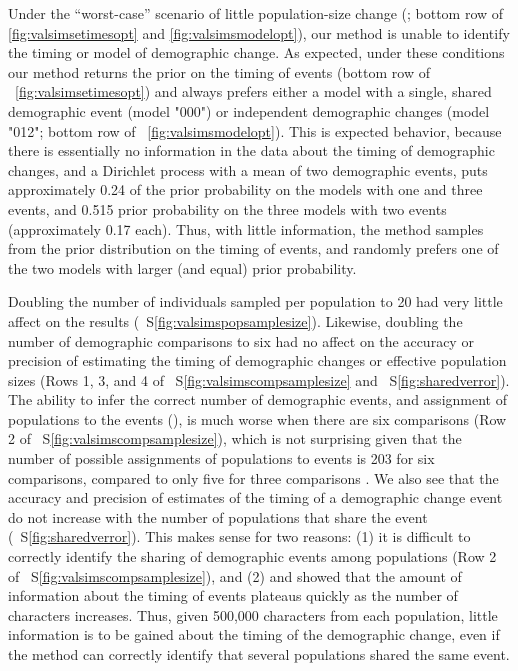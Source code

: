 \ifembed{

}{}

Under the ``worst-case'' scenario of little population-size change
(\vsimnochange; bottom row of \figs \ref{fig:valsimsetimesopt} and
\ref{fig:valsimsmodelopt}),
our method is unable to identify the timing or model of demographic change.
As expected, under these conditions our method returns the prior on the timing
of events (bottom row of \fig{}~\ref{fig:valsimsetimesopt})
and always prefers either a model with a single, shared demographic
event (model "000") or independent demographic changes (model "012";
bottom row of \fig{}~\ref{fig:valsimsmodelopt}).
This is expected behavior, because there is essentially no information in the
data about the timing of demographic changes, and a Dirichlet process with a
mean of two demographic events, puts approximately 0.24 of the prior
probability on the models with one and three events, and 0.515 prior
probability on the three models with two events (approximately 0.17 each).
Thus, with little information, the method samples from the prior distribution
on the timing of events, and randomly prefers one of the two models with larger
(and equal) prior probability.

Doubling the number of individuals sampled per population to 20 had very little
affect on the results
(\fig{}~S\ref{fig:valsimspopsamplesize}).
Likewise, doubling the number of demographic comparisons to six had no affect
on the accuracy or precision of estimating the timing of demographic changes
or effective population sizes
(Rows 1, 3, and 4 of \fig{}~S\ref{fig:valsimscompsamplesize}
and \fig{}~S\ref{fig:sharedverror}).
The ability to infer the correct number of demographic events,
and assignment of populations to the events (\etimesets),
is much worse when there are six comparisons
(Row 2 of \fig{}~S\ref{fig:valsimscompsamplesize}),
which is not surprising given that the number of possible assignments of
populations to events is 203 for six comparisons, compared to only five for
three comparisons \citep{Bell1934}.
We also see that
the accuracy and precision of estimates of the timing of a demographic change
event do not increase with the number of populations that share the event
(\fig{}~S\ref{fig:sharedverror}).
This makes sense for two reasons:
(1) it is difficult to correctly identify the sharing of demographic events
among populations
(Row 2 of \fig{}~S\ref{fig:valsimscompsamplesize}),
and
(2) \citet{Oaks2018ecoevolity} and \citet{Oaks2018paic}
showed that the amount of information about the timing of events plateaus
quickly as the number of characters increases.
Thus, given 500,000 characters from each population, little information is to
be gained about the timing of the demographic change, even if the method can
correctly identify that several populations shared the same event.


